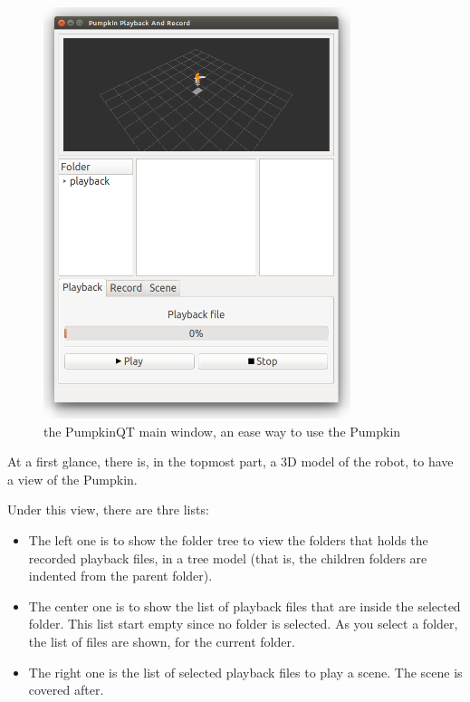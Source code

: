 \documentclass[oneside,a4paper,titlepage]{article}
\begin{document}
\begin{figure}[ht!]
	\centering
	\includegraphics[width=0.8\textwidth]{main_window}
	\caption[Main Window]{the PumpkinQT main window, an ease way to use the Pumpkin}
	\label{fig:main_window}
\end{figure}

At a first glance, there is, in the topmost part, a 3D model of the robot, to have a view of the Pumpkin.

Under this view, there are thre lists:

\begin{itemize}
	\item The left one is to show the folder tree to view the folders that holds the recorded playback files, in a tree model (that is, the children folders are indented from the parent folder).

	\item The center one is to show the list of playback files that are inside the selected folder. This list start empty since no folder is selected. As you select a folder, the list of files are shown, for the current folder.
	
	\item The right one is the list of selected playback files to play a scene. The scene is covered after.
\end{itemize}
\end{document}
